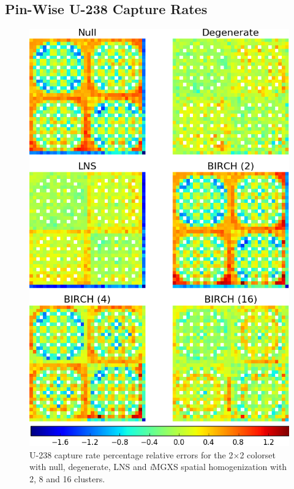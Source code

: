 \documentclass[12pt,twoside]{mitthesis-exec}
\begin{document}
\subsection*{Pin-Wise U-238 Capture Rates}

\begin{figure}[h!]
\centering
\includegraphics[width=0.83\linewidth]{figures/results/spatial/reflector/capt-err}
\vspace{2mm}
\caption[U-238 capture rate errors for the 2$\times$2 colorset]{U-238 capture rate percentage relative errors for the 2$\times$2 colorset with null, degenerate, LNS and \textit{i}MGXS spatial homogenization with 2, 8 and 16 clusters.}
\label{fig:refl-capt-err}
\end{figure}

\clearpage
\end{document}
